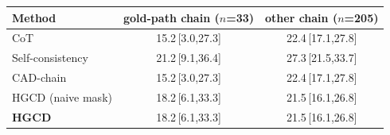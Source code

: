\begin{tabular}{lcc}
\toprule
Method & gold-path chain ($n$=33) & other chain ($n$=205) \\
\midrule
CoT & 15.2\,{\scriptsize[3.0,27.3]} & 22.4\,{\scriptsize[17.1,27.8]} \\
Self-consistency & 21.2\,{\scriptsize[9.1,36.4]} & 27.3\,{\scriptsize[21.5,33.7]} \\
CAD-chain & 15.2\,{\scriptsize[3.0,27.3]} & 22.4\,{\scriptsize[17.1,27.8]} \\
HGCD (naive mask) & 18.2\,{\scriptsize[6.1,33.3]} & 21.5\,{\scriptsize[16.1,26.8]} \\
\textbf{HGCD} & 18.2\,{\scriptsize[6.1,33.3]} & 21.5\,{\scriptsize[16.1,26.8]} \\
\bottomrule
\end{tabular}
